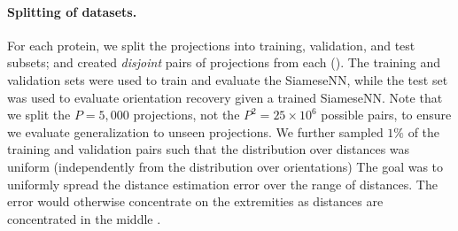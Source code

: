 \paragraph{Splitting of datasets.}
For each protein, we split the projections into training, validation, and test subsets; and created \textit{disjoint} pairs of projections from each ().
The training and validation sets were used to train and evaluate the SiameseNN, while the test set was used to evaluate orientation recovery given a trained SiameseNN.
Note that we split the $P=5,000$ projections, not the $P^2 = 25 \times 10^6$ possible pairs, to ensure we evaluate generalization to unseen projections.
We further sampled $1\%$ of the training and validation pairs such that the distribution over distances was uniform (independently from the distribution over orientations)
The goal was to uniformly spread the distance estimation error over the range of distances.
The error would otherwise concentrate on the extremities as distances are concentrated in the middle .

